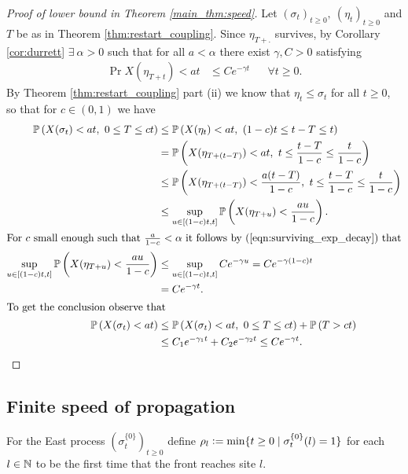 \begin{proof}[Proof of lower bound in Theorem \ref{main_thm:speed}]
Let $(\sigma_t)_{t \geq 0},\ (\eta_t)_{t \geq 0}$ and $T$ be as in Theorem \ref{thm:restart_coupling}. Since $\eta_{T + .}$ survives, by Corollary \ref{cor:durrett} $\exists\ \alpha > 0$ such that for all $a < \alpha$ there exist $\gamma, C > 0$ satisfying 
\begin{align}\label{eqn:surviving_exp_decay}
  \Pr{X(\eta_{T+t}) < at} &\leq C e^{- \gamma t}  &&\forall t \geq 0. 
\end{align}
By Theorem \ref{thm:restart_coupling} part (ii) we know that $\eta_t \leq \sigma_t$ for all $t \geq 0$, so that for $c \in (0,1)$ we have
\begin{align*}
  \Pr{X(\sigma_t) < at,\ 0 \leq T \leq ct} &\leq \Pr{X(\eta_t) < at,\ (1-c)t \leq t-T \leq t} \\
                                           &=    \Pr{X(\eta_{T + (t - T)}) < at,\ t \leq \frac{t-T}{1-c} \leq \frac{t}{1-c}} \\
                                           &\leq \Pr{X(\eta_{T + (t - T)}) < \frac{a(t - T)}{1-c},\ t \leq \frac{t-T}{1-c} \leq \frac{t}{1-c}} \\
                                           &\leq \sup\limits_{u \in [(1-c)t,t]} \Pr{X(\eta_{T + u}) < \frac{au}{1-c}}. \\
  \intertext{For $c$ small enough such that $\frac{a}{1-c} < \alpha$ it follows by (\ref{eqn:surviving_exp_decay}) that}
  \sup\limits_{u \in [(1-c)t,t]} \Pr{X(\eta_{T + u}) < \frac{au}{1-c}} &\leq \sup\limits_{u \in [(1-c)t,t]} C e^{-\gamma u}  = C e^{-\gamma (1-c) t} \\
                                                                       &= C e^{-\gamma t}. \\ 
  \intertext{To get the conclusion observe that}
    \Pr{X(\sigma_t) < at}  &\leq \Pr{X(\sigma_t) < at,\ 0 \leq T \leq ct} + \Pr{T > ct} \\
                           &\leq C_1 e^{-\gamma_1 t} + C_2 e^{-\gamma_2 t} \leq C e^{-\gamma t}. 
\end{align*}
\end{proof}

\subsection{Finite speed of propagation}

\begin{definition}\label{def:hitting_times}
For the East process $(\sigma^{\{0\}}_t)_{t \geq 0}$ define $\rho_l \defeq \min\{ t \geq 0 \mid \sigma^{\{0\}}_t(l) = 1\}$ for each $l \in \N$ to be the first time that the front reaches site $l$. 
\end{definition}

